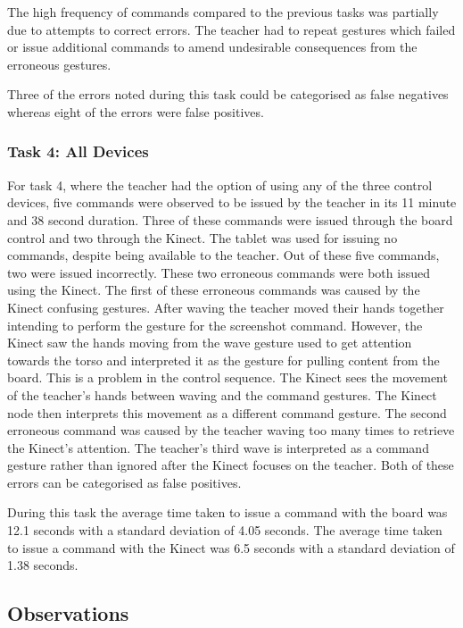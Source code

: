 \documentclass[link]{IWCOMP}
\begin{document}
The high frequency of commands compared to the previous tasks was partially due to attempts to correct errors.
The teacher had to repeat gestures which failed or issue additional commands to amend undesirable consequences from the erroneous gestures.

Three of the errors noted during this task could be categorised as false negatives whereas eight of the errors were false positives.

\subsubsection{Task 4: All Devices}
\label{subsubsec:studyPhase1ResultsTask4}

For task 4, where the teacher had the option of using any of the three control devices, five commands were observed to be issued by the teacher in its 11 minute and 38 second duration.
Three of these commands were issued through the board control and two through the Kinect.
The tablet was used for issuing no commands, despite being available to the teacher.
Out of these five commands, two were issued incorrectly.
These two erroneous commands were both issued using the Kinect.
The first of these erroneous commands was caused by the Kinect confusing gestures.
After waving the teacher moved their hands together intending to perform the gesture for the screenshot command.
However, the Kinect saw the hands moving from the wave gesture used to get attention towards the torso and interpreted it as the gesture for pulling content from the board.
This is a problem in the control sequence.
The Kinect sees the movement of the teacher's hands between waving and the command gestures.
The Kinect node then interprets this movement as a different command gesture.
The second erroneous command was caused by the teacher waving too many times to retrieve the Kinect's attention.
The teacher's third wave is interpreted as a command gesture rather than ignored after the Kinect focuses on the teacher.
Both of these errors can be categorised as false positives.

During this task the average time taken to issue a command with the board was 12.1 seconds with a standard deviation of 4.05 seconds.
The average time taken to issue a command with the Kinect was 6.5 seconds with a standard deviation of 1.38 seconds.

\subsection{Observations}
\label{subsec:studyPhase1Observations}
\end{document}
